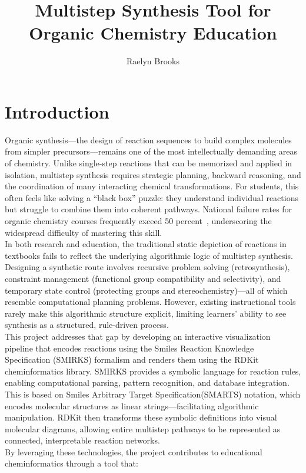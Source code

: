 \documentclass[12pt]{article}
\title{\textbf{Multistep Synthesis Tool for Organic Chemistry Education}}
\author{Raelyn Brooks}
\begin{document}
\maketitle

\section{Introduction}
\indent
Organic synthesis—the design of reaction sequences to build complex molecules from simpler precursors—remains one of the most intellectually demanding areas of chemistry.
Unlike single-step reactions that can be memorized and applied in isolation, multistep synthesis requires strategic planning, backward reasoning, and the coordination of many interacting chemical transformations.
For students, this often feels like solving a “black box” puzzle: they understand individual reactions but struggle to combine them into coherent pathways.
National failure rates for organic chemistry courses frequently exceed 50 percent~\cite{mooring2016flipped}, underscoring the widespread difficulty of mastering this skill.
\\
\indent
In both research and education, the traditional static depiction of reactions in textbooks fails to reflect the underlying algorithmic logic of multistep synthesis.
Designing a synthetic route involves recursive problem solving (retrosynthesis), constraint management (functional group compatibility and selectivity), and temporary state control (protecting groups and stereochemistry)—all of which resemble computational planning problems.
However, existing instructional tools rarely make this algorithmic structure explicit, limiting learners’ ability to see synthesis as a structured, rule-driven process.
\\
\indent
This project addresses that gap by developing an interactive visualization pipeline that encodes reactions using the Smiles Reaction Knowledge Specification (SMIRKS) formalism and renders them using the RDKit cheminformatics library.
SMIRKS provides a symbolic language for reaction rules, enabling computational parsing, pattern recognition, and database integration. This is based on Smiles Arbitrary Target Specification(SMARTS) notation, which encodes molecular structures as linear strings—facilitating algorithmic manipulation.
RDKit then transforms these symbolic definitions into visual molecular diagrams, allowing entire multistep pathways to be represented as connected, interpretable reaction networks.
\\
\indent
By leveraging these technologies, the project contributes to educational cheminformatics through a tool that:
\end{document}
